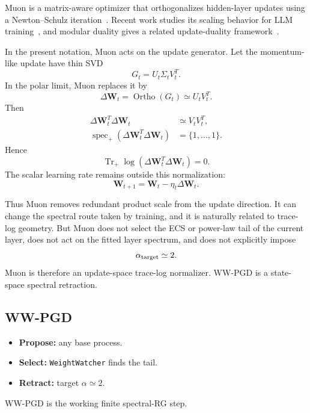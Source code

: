 \documentclass[10pt,twocolumn]{article}
\newcommand{\WW}{\texttt{WeightWatcher}}
\newcommand{\Tr}{\operatorname{Tr}}
\newcommand{\W}{\mathbf W}
\newcommand{\takeaway}[1]{%
  \par\vspace{4pt}\noindent\textcolor{boxblue}{#1}%
}
\begin{document}
Muon is a matrix-aware optimizer that orthogonalizes hidden-layer updates using a Newton--Schulz iteration~\cite{JordanMuon2024}.  Recent work studies its scaling behavior for LLM training~\cite{LiuMuonScalable2025}, and modular duality gives a related update-duality framework~\cite{BernsteinNewhouse2025}.

In the present notation, Muon acts on the update generator.  Let the momentum-like update have thin SVD
\begin{equation}
        G_t=U_t\Sigma_tV_t^T .
\end{equation}
In the polar limit, Muon replaces it by
\begin{equation}
        \Delta\W_t
        =
        \operatorname{Ortho}(G_t)
        \simeq
        U_tV_t^T .
\label{eq:muon_ortho_replacement}
\end{equation}
Then
\begin{align}
        \Delta\W_t^T\Delta\W_t
        &\simeq
        V_tV_t^T,
        \\
        \operatorname{spec}_{+}
        (\Delta\W_t^T\Delta\W_t)
        &=
        \{1,\ldots,1\}.
\end{align}
Hence
\begin{equation}
        \boxed{
        \Tr_{+}\log(\Delta\W_t^T\Delta\W_t)=0 .}
\label{eq:muon_trace_log_zero}
\end{equation}
The scalar learning rate remains outside this normalization:
\begin{equation}
        \W_{t+1}=\W_t-\eta_t\Delta\W_t .
\end{equation}

Thus Muon removes redundant product scale from the update direction.  It can change the spectral route taken by training, and it is naturally related to trace-log geometry.  But Muon does not select the ECS or power-law tail of the current layer, does not act on the fitted layer spectrum, and does not explicitly impose
\begin{equation}
        \alpha_{\rm target}\simeq2 .
\end{equation}
Muon is therefore an update-space trace-log normalizer.  WW-PGD is a state-space spectral retraction.

\endgroup
\newpage
\subsection{WW-PGD}
\label{sxn:wwpgd_method}


\begin{tcolorbox}[marginalbox,title=\textbf{13C. WW-PGD}]
\begin{itemize}
\item \textbf{Propose:} any base process.
\item \textbf{Select:} \WW{} finds the tail.
\item \textbf{Retract:} target \(\alpha\simeq2\).
\end{itemize}
\takeaway{WW-PGD is the working finite spectral-RG step.}
\end{tcolorbox}
\end{document}
